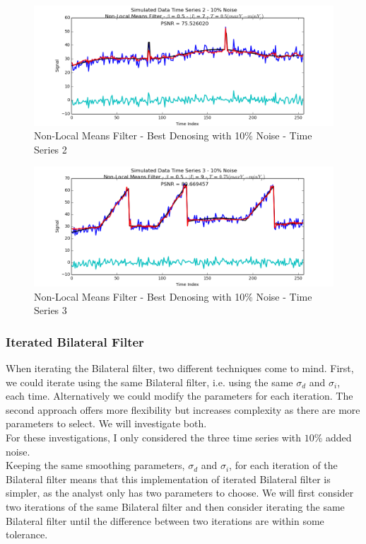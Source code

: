 \documentclass[11pt]{article}
\theoremstyle{definition}
\begin{document}
\begin{figure}
\centering
\includegraphics[width = 0.75 \textwidth]{NLMeansSignal2Best.png}
\caption{Non-Local Means Filter - Best Denosing with 10\% Noise - Time Series 2}
\label{nlmeans2best}
\end{figure}

\begin{figure}
\centering
\includegraphics[width = 0.75 \textwidth]{NLMeansSignal3Best.png}
\caption{Non-Local Means Filter - Best Denosing with 10\% Noise - Time Series 3}
\label{nlmeans3best}
\end{figure}

\newpage


\subsubsection{Iterated Bilateral Filter}

When iterating the Bilateral filter, two different techniques come to mind. First, we could iterate using the same Bilateral filter, i.e. using the same $\sigma_d$ and $\sigma_i$, each time. Alternatively we could modify the parameters for each iteration. The second approach offers more flexibility but increases complexity as there are more parameters to select. We will investigate both.\\

For these investigations, I only considered the three time series with $10$\% added noise.\\

Keeping the same smoothing parameters, $\sigma_d$ and $\sigma_i$, for each iteration of the Bilateral filter means that this implementation of iterated Bilateral filter is simpler, as the analyst only has two parameters to choose. We will first consider two iterations of the same Bilateral filter and then consider iterating the same Bilateral filter until the difference between two iterations are within some tolerance.
\end{document}
